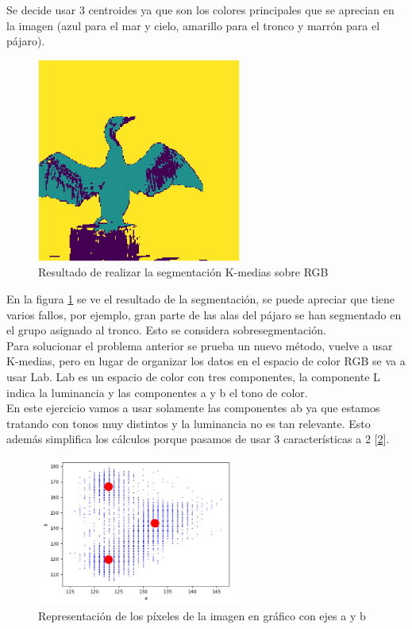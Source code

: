 \documentclass[a4paper,12pt]{report}
\begin{document}
 Se decide usar 3 centroides ya que son los colores principales que se aprecian en la imagen (azul para el mar y cielo, amarillo para el tronco y marrón para el pájaro).\\

\begin{figure}[h]
\centering
\includegraphics[width=0.6\textwidth]{imagenes/segmentacionrgb}
\caption{Resultado de realizar la segmentación K-medias sobre RGB}
\label{segmentacionrgb}
\end{figure}

En la figura \ref{segmentacionrgb} se ve el resultado de la segmentación, se puede apreciar que tiene varios fallos, por ejemplo, gran parte de las alas del pájaro se han segmentado en el grupo asignado al tronco. Esto se considera sobresegmentación.\\

Para solucionar el problema anterior se prueba un nuevo método, vuelve a usar K-medias, pero en lugar  de organizar los datos en el espacio de color RGB se va a usar Lab. Lab es un espacio de color con tres componentes, la componente L indica la luminancia y las componentes a y b el tono de color.\\

En este ejercicio vamos a usar solamente las componentes ab ya que estamos tratando con tonos muy distintos y la luminancia no es tan relevante. Esto además simplifica los cálculos porque pasamos de usar 3 características a 2 [\ref{cormoranlab}].\\

\begin{figure}[h]
\centering
\includegraphics[width=0.6\textwidth]{imagenes/cormoranlab}
\caption{Representación de los píxeles de la imagen en gráfico con ejes a y b}
\label{cormoranlab}
\end{figure}
\end{document}
